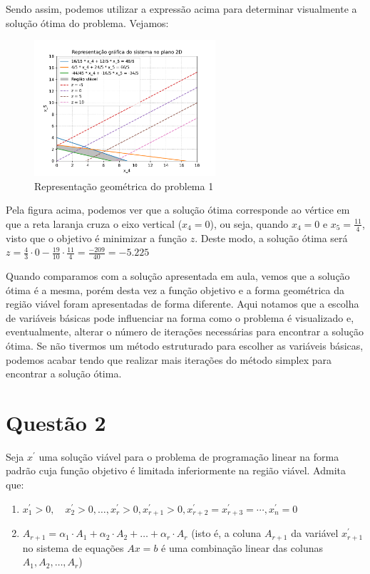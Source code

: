 \documentclass{article}
\begin{document}
Sendo assim, podemos utilizar a expressão acima para determinar visualmente a solução ótima do problema.
Vejamos:

\begin{figure}[h]
  \centering
  \includegraphics[width=0.6\textwidth]{images/Q1-grafico-com-z.pdf}
  \caption{Representação geométrica do problema 1}
\end{figure}

Pela figura acima, podemos ver que a solução ótima corresponde ao vértice em que a reta laranja cruza o eixo vertical ($x_4 = 0$), ou seja, quando $x_4 = 0$ e $x_5 = \frac{11}{4}$, visto que o objetivo é minimizar a função $z$.
Deste modo, a solução ótima será $z = \frac{4}{3} \cdot 0 - \frac{19}{10} \cdot \frac{11}{4} = \frac{-209}{40} = - 5.225$

Quando comparamos com a solução apresentada em aula, vemos que a solução ótima é a mesma, porém desta vez a função objetivo e a forma geométrica da região viável foram apresentadas de forma diferente.
Aqui notamos que a escolha de variáveis básicas pode influenciar na forma como o problema é visualizado e, eventualmente, alterar o número de iterações necessárias para encontrar a solução ótima.
Se não tivermos um método estruturado para escolher as variáveis básicas, podemos acabar tendo que realizar mais iterações do método simplex para encontrar a solução ótima.

\section{Questão 2}

Seja $x^{\prime}$ uma solução viável para o problema de programação linear na forma padrão cuja função objetivo é limitada inferiormente na região viável.
Admita que:

\begin{enumerate}
  \item $x^{\prime}_{1} > 0, \quad x^{\prime}_{2} > 0, \dots, x_{r}^{\prime} > 0, x_{r+1}^{\prime} > 0, x_{r+2}^{\prime} = x_{r+3}^{\prime}=\cdots, x_{n}^{\prime}=0$ 
  \item $A_{r+1} = \alpha_{1} \cdot A_{1} + \alpha_{2} \cdot A_{2} + \dots + \alpha_{r} \cdot A_{r}$ (isto é, a coluna $A_{r+1}$ da variável $x^{\prime}_{r+1}$ no sistema de equações $Ax = b$ é uma combinação linear das colunas $A_{1}, A_{2}, \dots, A_{r}$)
\end{enumerate}
\end{document}
